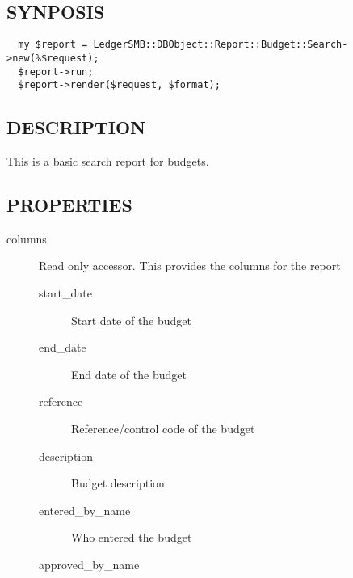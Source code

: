 \begin{description}
\begin{description}
\begin{description}
\begin{description}
\begin{description}
\begin{description}
\begin{description}
\begin{description}
\begin{description}
\begin{description}
\subsection*{SYNPOSIS\label{LedgerSMB::DBObject::Reports::Budget::Search_SYNPOSIS}}
\begin{verbatim}
  my $report = LedgerSMB::DBObject::Report::Budget::Search->new(%$request);
  $report->run;
  $report->render($request, $format);
\end{verbatim}
\subsection*{DESCRIPTION\label{LedgerSMB::DBObject::Reports::Budget::Search_DESCRIPTION}}


This is a basic search report for budgets.

\subsection*{PROPERTIES\label{LedgerSMB::DBObject::Reports::Budget::Search_PROPERTIES}}
\begin{description}

\item[{columns}] \mbox{}

Read only accessor.  This provides the columns for the report

\begin{description}

\item[{start\_date}] \mbox{}

Start date of the budget


\item[{end\_date}] \mbox{}

End date of the budget


\item[{reference}] \mbox{}

Reference/control code of the budget


\item[{description}] \mbox{}

Budget description


\item[{entered\_by\_name}] \mbox{}

Who entered the budget


\item[{approved\_by\_name}] \mbox{}


\end{description}
\end{description}
\end{description}
\end{description}
\end{description}
\end{description}
\end{description}
\end{description}
\end{description}
\end{description}
\end{description}
\end{description}
